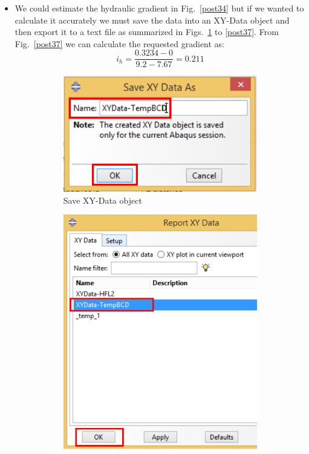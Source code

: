 \begin{itemize}
\item We could estimate the hydraulic gradient in Fig.~\ref{post34}
  but if we wanted to calculate it accurately we must save the data
  into an XY-Data object and then export it to a text file as
  summarized in Figs.~\ref{post35} to \ref{post37}. From
  Fig.~\ref{post37} we can calculate the requested gradient as:
  \begin{equation}
    \label{eq:02}
    i_h=\frac{0.3234-0}{9.2-7.67}=0.211
  \end{equation}

   \begin{figure}[!h]
     \centering
     \begin{subfigure}[!h]{0.33\textwidth}
       \includegraphics[width=\textwidth]{./body/images/post35.pdf}
       \caption{Save XY-Data object}
       \label{post35}
     \end{subfigure}%
     \begin{subfigure}[!h]{0.33\textwidth}
       \includegraphics[width=\textwidth]{./body/images/post36.pdf}

\end{subfigure}
\end{figure}
\end{itemize}
